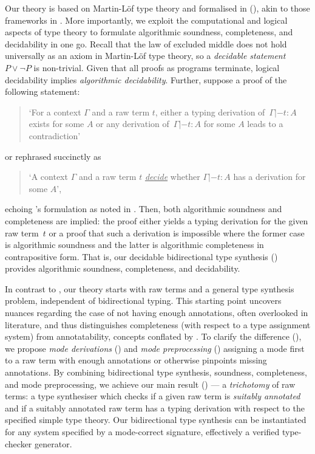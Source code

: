 Our theory is based on Martin-L\"of type theory and formalised in \Agda (), akin to those frameworks in .
More importantly, we exploit the computational and logical aspects of type theory to formulate algorithmic soundness, completeness, and decidability in one go. 
Recall that the law of excluded middle does not hold universally as an axiom in Martin-L\"of type theory, so a \emph{decidable statement} $P \vee \neg P$ is non-trivial.
Given that all proofs as programs terminate, logical decidability implies \emph{algorithmic decidability}.
Further, suppose a proof of the following statement:
\begin{quote}
  `For a context $\Gamma$ and a raw term $t$, either a typing derivation of\, $\Gamma |- t : A$ exists for some $A$ or any derivation of\, $\Gamma |- t : A$ for some $A$ leads to a contradiction'
\end{quote}
or rephrased succinctly as 
\begin{quote}
  `A context $\Gamma$ and a raw term $t$ \underline{\emph{decide}} whether $\Gamma |- t : A$ has a derivation for some $A$',
\end{quote}
echoing \citeauthor{Wadler2022}'s formulation as noted in .
Then, both algorithmic soundness and completeness are implied:
the proof either yields a typing derivation for the given raw term~$t$ or a proof that such a derivation is impossible where the former case is algorithmic soundness and the latter is algorithmic completeness in contrapositive form.
That is, our decidable bidirectional type synthesis () provides algorithmic soundness, completeness, and decidability. 

In contrast to \citeauthor{Wadler2022}, our theory starts with raw terms and a general type synthesis problem, independent of bidirectional typing.
This starting point uncovers nuances regarding the case of not having enough annotations, often overlooked in literature, and thus distinguishes completeness (with respect to a type assignment system) from annotatability, concepts conflated by \citet{Dunfield2021}. 
To clarify the difference (), we propose \emph{mode derivations} () and \emph{mode preprocessing} () assigning a mode first to a raw term with enough annotations or otherwise pinpoints missing annotations.
By combining bidirectional type synthesis, soundness, completeness, and mode preprocessing, we achieve our main result () --- a \emph{trichotomy} of raw terms: a type synthesiser which checks if a given raw term is \emph{suitably annotated} and if a suitably annotated raw term has a typing derivation with respect to the specified simple type theory.
Our bidirectional type synthesis can be instantiated for any system specified by a mode-correct signature, effectively a verified type-checker generator. 

